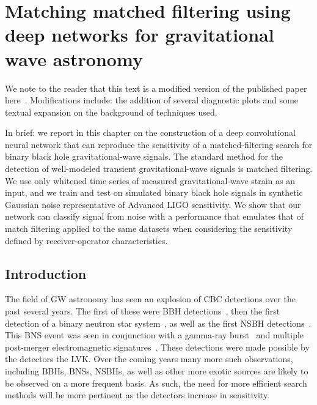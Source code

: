 \chapter[Matching matched filtering]{Matching matched filtering using deep networks for gravitational wave astronomy}\label{ch:chap_4}

We note to the reader that this text is a modified version of the 
published paper here~\cite{PhysRevLett.120.141103}. Modifications include: 
the addition of several diagnostic plots and some textual expansion on the 
background of techniques used.

In brief: we report in this chapter on the construction of a deep 
convolutional neural network that can reproduce the 
sensitivity of a matched-filtering search for binary black hole gravitational-wave signals. 
The standard method for the detection of well-modeled transient gravitational-wave signals 
is matched filtering. We use only whitened time series of measured gravitational-wave strain as 
an input, and we train and test on simulated binary black hole signals in synthetic 
Gaussian noise representative of Advanced LIGO sensitivity. We show that our network can 
classify signal from noise with a performance that emulates that of match filtering applied 
to the same datasets when considering the sensitivity defined by receiver-operator characteristics.

%
%


\section{Introduction}
%
%
The field of \ac{GW} astronomy has seen an explosion of \ac{CBC} 
detections over the past several years. The first of these were 
\ac{BBH} detections~\cite{PhysRevLett.116.061102, PhysRevLett.116.241103, PhysRevLett.118.221101,1811.12907,2010.14527}, then the 
first detection of a binary neutron star 
system~\cite{PhysRevLett.119.161101}, as well as
the first \ac{NSBH} detections~\cite{Abbott_2021}. 
This \ac{BNS} event was seen in conjunction with a gamma-ray
burst~\cite{2017arXiv171005834L,2017arXiv171005446G,2017arXiv171005449S} 
and multiple post-merger electromagnetic signatures~\cite{2017arXiv171005833L}. 
These detections were made possible by the 
detectors the \ac{LVK}. Over the coming years many more such 
observations, including \acp{BBH}, \acp{BNS}, \acp{NSBH}, as well as other 
more exotic sources are likely to be observed on a more frequent basis. 
As such, the need for more efficient search methods will be 
more pertinent as the detectors increase in sensitivity.

